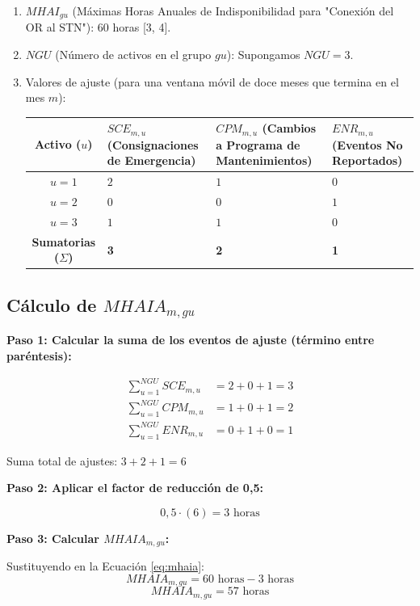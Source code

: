\documentclass[a5paper]{book}%
\begin{document}
\begin{enumerate}
	\item $MHAI_{gu}$ (Máximas Horas Anuales de Indisponibilidad para "Conexión del OR al STN"): $60$ horas [3, 4].
	\item $NGU$ (Número de activos en el grupo $gu$): Supongamos $NGU = 3$.
	\item Valores de ajuste (para una ventana móvil de doce meses que termina en el mes $m$):
	
	\begin{center}
		\begin{tabular}{|c|p{2cm}|p{2cm}|p{2cm}|}
			\hline
			Activo ($u$) & $SCE_{m, u}$ (Consignaciones de Emergencia) & $CPM_{m, u}$ (Cambios a Programa de Mantenimientos) & $ENR_{m, u}$ (Eventos No Reportados) \\
			\hline
			$u=1$ & $2$ & $1$ & $0$ \\
			$u=2$ & $0$ & $0$ & $1$ \\
			$u=3$ & $1$ & $1$ & $0$ \\
			\hline
			\textbf{Sumatorias ($\Sigma$)} & \textbf{3} & \textbf{2} & \textbf{1} \\
			\hline
		\end{tabular}
	\end{center}
\end{enumerate}

\subsection*{Cálculo de $MHAI A_{m, gu}$}

\textbf{Paso 1: Calcular la suma de los eventos de ajuste (término entre paréntesis):}

\begin{align*}
	\sum_{u=1}^{NGU} SCE_{m, u} &= 2 + 0 + 1 = 3 \\
	\sum_{u=1}^{NGU} CPM_{m, u} &= 1 + 0 + 1 = 2 \\
	\sum_{u=1}^{NGU} ENR_{m, u} &= 0 + 1 + 0 = 1
\end{align*}

Suma total de ajustes: $3 + 2 + 1 = 6$

\textbf{Paso 2: Aplicar el factor de reducción de 0,5:}

$$ 0,5 \cdot \left( 6 \right) = 3 \text{ horas} $$

\textbf{Paso 3: Calcular $MHAI A_{m, gu}$:}

Sustituyendo en la Ecuación \ref{eq:mhaia}:
$$ MHAI A_{m, gu} = 60 \text{ horas} - 3 \text{ horas} $$
$$ MHAI A_{m, gu} = 57 \text{ horas} $$
\end{document}
